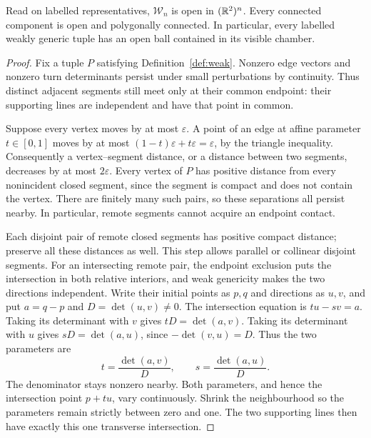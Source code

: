 \begin{lemma}\label{lem:weak-open}
Read on labelled representatives, $\mathcal W_n$ is open in
$(\mathbb R^2)^n$. Every connected component is open and polygonally
connected. In particular, every labelled weakly generic tuple has
an open ball contained in its visible chamber.
\end{lemma}
\begin{proof}
Fix a tuple $P$ satisfying Definition~\ref{def:weak}. Nonzero edge
vectors and nonzero turn determinants persist under small perturbations
by continuity. Thus distinct adjacent segments still meet only at their common
endpoint: their supporting lines are independent and have that point
in common.

Suppose every vertex moves by at most $\varepsilon$. A point of an
edge at affine parameter $t\in[0,1]$ moves by at most
$(1-t)\varepsilon+t\varepsilon=\varepsilon$, by the triangle
inequality. Consequently a vertex--segment distance, or a distance
between two segments, decreases by at most $2\varepsilon$.
Every vertex of $P$ has positive distance from every nonincident
closed segment, since the segment is compact and does not contain
the vertex. There are finitely many such pairs, so these separations
all persist nearby. In particular, remote segments cannot acquire
an endpoint contact.

Each disjoint pair of remote closed segments has positive compact
distance; preserve all these distances as well. This step allows
parallel or collinear disjoint segments. For an intersecting remote
pair, the endpoint exclusion puts the intersection in both relative
interiors, and weak genericity makes the two directions independent.
Write their initial points as $p,q$ and directions as $u,v$, and put
$a=q-p$ and $D=\det(u,v)\neq0$. The intersection equation is
$tu-sv=a$. Taking its determinant with $v$ gives
$tD=\det(a,v)$. Taking its determinant with $u$ gives
$sD=\det(a,u)$, since $-\det(v,u)=D$. Thus the two parameters are
\begin{equation}\label{eq:weak-open-parameters}
 t=\frac{\det(a,v)}D,\qquad s=\frac{\det(a,u)}D.
\end{equation}
The denominator stays nonzero nearby. Both parameters, and hence the
intersection point $p+tu$, vary continuously. Shrink the neighbourhood
so the parameters remain strictly between zero and one. The two
supporting lines then have exactly this one transverse intersection.


\end{proof}
